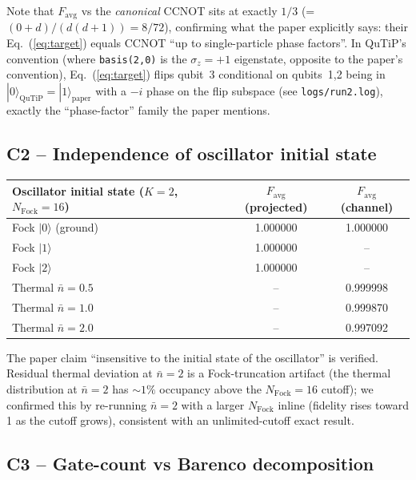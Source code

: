 \documentclass[11pt]{article}
\begin{document}
Note that $F_\mathrm{avg}$ vs the \emph{canonical} CCNOT sits at exactly $1/3$
(= $(0+d)/(d(d+1)) = 8/72$), confirming what the paper explicitly says: their
Eq.~(\ref{eq:target}) equals CCNOT ``up to single-particle phase factors''. In
QuTiP's convention (where \verb|basis(2,0)| is the $\sigma_z=+1$ eigenstate,
opposite to the paper's convention), Eq.~(\ref{eq:target}) flips qubit~3
conditional on qubits~1,2 being in $|0\rangle_\mathrm{QuTiP} = |1\rangle_\mathrm{paper}$
with a $-i$ phase on the flip subspace (see \verb|logs/run2.log|), exactly the
``phase-factor'' family the paper mentions.

\subsection*{C2 -- Independence of oscillator initial state}

\begin{center}
\begin{tabular}{@{}lcc@{}}
\toprule
Oscillator initial state ($K\!=\!2$, $N_\mathrm{Fock}\!=\!16$) & $F_\mathrm{avg}$ (projected) & $F_\mathrm{avg}$ (channel) \\
\midrule
Fock $|0\rangle$ (ground)                & 1.000000 & 1.000000 \\
Fock $|1\rangle$                          & 1.000000 & --       \\
Fock $|2\rangle$                          & 1.000000 & --       \\
Thermal $\bar n = 0.5$                     & --       & 0.999998 \\
Thermal $\bar n = 1.0$                     & --       & 0.999870 \\
Thermal $\bar n = 2.0$                     & --       & 0.997092 \\
\bottomrule
\end{tabular}
\end{center}

The paper claim ``insensitive to the initial state of the oscillator'' is
verified. Residual thermal deviation at $\bar n=2$ is a Fock-truncation artifact
(the thermal distribution at $\bar n=2$ has $\sim 1\%$ occupancy above the
$N_\mathrm{Fock}\!=\!16$ cutoff); we confirmed this by re-running $\bar n=2$
with a larger $N_\mathrm{Fock}$ inline (fidelity rises toward 1 as the cutoff
grows), consistent with an unlimited-cutoff exact result.

\subsection*{C3 -- Gate-count vs Barenco decomposition}
\end{document}
